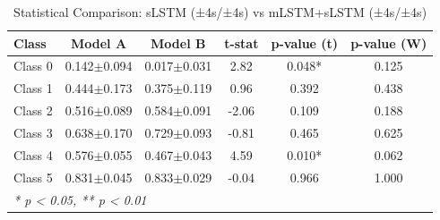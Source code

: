 \begin{table}[htbp]
\centering
\caption{Statistical Comparison: sLSTM (±4s/±4s) vs mLSTM+sLSTM (±4s/±4s)}
\label{tab:comparison_class_slstm_±4s_±4s_vs_mlstmslstm_±4s_±4s}
\begin{tabular}{lccccc}
\toprule
\textbf{Class} & \textbf{Model A} & \textbf{Model B} & \textbf{t-stat} & \textbf{p-value (t)} & \textbf{p-value (W)} \\
\midrule
Class 0 & 0.142$\pm$0.094 & 0.017$\pm$0.031 & 2.82 & 0.048* & 0.125 \\
Class 1 & 0.444$\pm$0.173 & 0.375$\pm$0.119 & 0.96 & 0.392 & 0.438 \\
Class 2 & 0.516$\pm$0.089 & 0.584$\pm$0.091 & -2.06 & 0.109 & 0.188 \\
Class 3 & 0.638$\pm$0.170 & 0.729$\pm$0.093 & -0.81 & 0.465 & 0.625 \\
Class 4 & 0.576$\pm$0.055 & 0.467$\pm$0.043 & 4.59 & 0.010* & 0.062 \\
Class 5 & 0.831$\pm$0.045 & 0.833$\pm$0.029 & -0.04 & 0.966 & 1.000 \\
\bottomrule
\multicolumn{6}{l}{\textit{* p < 0.05, ** p < 0.01}} \\
\end{tabular}
\end{table}